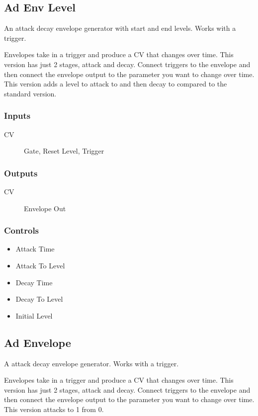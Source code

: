 \subsection{Ad Env Level}

An attack decay envelope generator with start and end levels. Works with a trigger.

Envelopes take in a  trigger and produce a CV that changes over time.
                  This version has just 2 stages, attack and decay. Connect triggers to the envelope and then connect the envelope output to the parameter you want to change over time.
                  This version adds a level to attack to and then decay to compared to the standard version.

\subsubsection{Inputs}
\begin{description}
\item [CV] Gate, Reset Level, Trigger
\end{description}

\subsubsection{Outputs}
\begin{description}
\item [CV] Envelope Out
\end{description}

\subsubsection{Controls}
\begin{itemize}
\item Attack Time
\item Attack To Level
\item Decay Time
\item Decay To Level
\item Initial Level
\end{itemize}

\subsection{Ad Envelope}

A attack decay envelope generator. Works with a trigger.

Envelopes take in a trigger and produce a CV that changes over time.
                  This version has just 2 stages, attack and decay. Connect triggers to the envelope and then connect the envelope output to the parameter you want to change over time.
                  This version attacks to 1 from 0.

